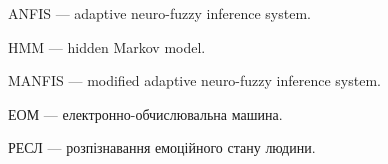 \shortings


ANFIS --- adaptive neuro-fuzzy inference system.
	
HMM --- hidden Markov model.
	
MANFIS --- modified adaptive neuro-fuzzy inference system.
	
ЕОМ --- електронно-обчислювальна машина.

РЕСЛ --- розпізнавання емоційного стану людини.
